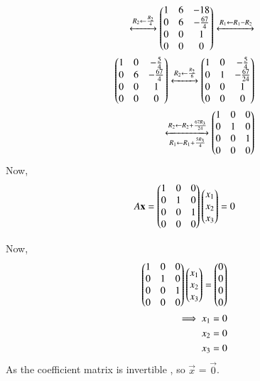 \documentclass[journal,12pt,twocolumn]{IEEEtran}
\renewcommand\thesection{\arabic{section}}
\begin{document}
\begin{align}
\xleftrightarrow[]{R_2\leftarrow \frac{R_2}{4}}
\begin{pmatrix}1 & 6 & -18\\0 & 6 & -\frac{67}{4}\\0 & 0 & 1\\0 & 0 & 0\end{pmatrix}\xleftrightarrow[]{R_1\leftarrow R_1-R_2}\\
\begin{pmatrix}1 & 0 & -\frac{5}{4}\\0 & 6 & -\frac{67}{4}\\0 & 0 & 1\\0 & 0 & 0\end{pmatrix}\xleftrightarrow[]{R_2\leftarrow \frac{R_2}{6}}
\begin{pmatrix}1 & 0 & -\frac{5}{4}\\0 & 1 & -\frac{67}{24}\\0 & 0 & 1\\0 & 0 & 0\end{pmatrix}\\
\xleftrightarrow[R_1\leftarrow R_1+\frac{5R_3}{4}]{R_2\leftarrow R_2+\frac{67R_3}{24}}
\begin{pmatrix}1 & 0 & 0\\0 & 1 & 0\\0 & 0 & 1\\0 & 0 & 0\end{pmatrix}
\end{align}
Now,
\begin{align}
A\mathbf{x} = \begin{pmatrix}1 & 0 & 0\\0 & 1 & 0\\0 & 0 & 1\\0 & 0 & 0\end{pmatrix}\begin{pmatrix}x_1\\x_2\\x_3\end{pmatrix} = 0
\end{align}


Now,
\begin{align}
\begin{pmatrix}1 & 0 & 0\\0 & 1 & 0\\0 & 0 & 1\\0 & 0 & 0\end{pmatrix} \begin{pmatrix}x_1\\x_2\\x_3\end{pmatrix} = \begin{pmatrix}0\\0\\0\\0\end{pmatrix}\\
\implies x_1 = 0\\
x_2 = 0\\
x_3=0\\
\end{align}
As the coefficient matrix is invertible , so $\vec{x}$ = $\vec{0}$.
\end{document}
